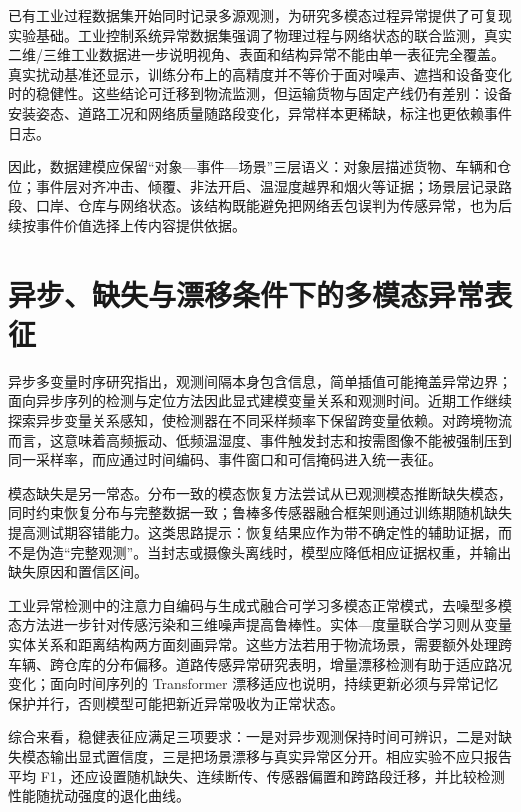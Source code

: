 \documentclass[11pt,a4paper]{article}
\begin{document}
已有工业过程数据集开始同时记录多源观测，为研究多模态过程异常提供了可复现实验基础\cite{amultimodaldataset2025}。工业控制系统异常数据集强调了物理过程与网络状态的联合监测\cite{industrialcontrolsystem2024}，真实二维/三维工业数据进一步说明视角、表面和结构异常不能由单一表征完全覆盖\cite{realiadd32025}。真实扰动基准还显示，训练分布上的高精度并不等价于面对噪声、遮挡和设备变化时的稳健性\cite{robustada2025}。这些结论可迁移到物流监测，但运输货物与固定产线仍有差别：设备安装姿态、道路工况和网络质量随路段变化，异常样本更稀缺，标注也更依赖事件日志。

因此，数据建模应保留“对象—事件—场景”三层语义：对象层描述货物、车辆和仓位；事件层对齐冲击、倾覆、非法开启、温湿度越界和烟火等证据；场景层记录路段、口岸、仓库与网络状态。该结构既能避免把网络丢包误判为传感异常，也为后续按事件价值选择上传内容提供依据。

\section{异步、缺失与漂移条件下的多模态异常表征}

异步多变量时序研究指出，观测间隔本身包含信息，简单插值可能掩盖异常边界；面向异步序列的检测与定位方法因此显式建模变量关系和观测时间\cite{practicalapproachto2021}。近期工作继续探索异步变量关系感知，使检测器在不同采样频率下保留跨变量依赖\cite{aaadasynchronousinter2025}。对跨境物流而言，这意味着高频振动、低频温湿度、事件触发封志和按需图像不能被强制压到同一采样率，而应通过时间编码、事件窗口和可信掩码进入统一表征。

模态缺失是另一常态。分布一致的模态恢复方法尝试从已观测模态推断缺失模态，同时约束恢复分布与完整数据一致\cite{distributionconsistentmodal2023}；鲁棒多传感器融合框架则通过训练期随机缺失提高测试期容错能力\cite{amultimodalsensor2022}。这类思路提示：恢复结果应作为带不确定性的辅助证据，而不是伪造“完整观测”。当封志或摄像头离线时，模型应降低相应证据权重，并输出缺失原因和置信区间。

工业异常检测中的注意力自编码与生成式融合可学习多模态正常模式\cite{mfganmultimodalfusion2024}，去噪型多模态方法进一步针对传感污染和三维噪声提高鲁棒性\cite{m3dmnrrgb2024}。实体—度量联合学习则从变量实体关系和距离结构两方面刻画异常\cite{madmelcombining2024}。这些方法若用于物流场景，需要额外处理跨车辆、跨仓库的分布偏移。道路传感异常研究表明，增量漂移检测有助于适应路况变化\cite{dynamicroadanomaly2024}；面向时间序列的 Transformer 漂移适应也说明，持续更新必须与异常记忆保护并行，否则模型可能把新近异常吸收为正常状态\cite{conceptdriftadaptation2022}。

综合来看，稳健表征应满足三项要求：一是对异步观测保持时间可辨识，二是对缺失模态输出显式置信度，三是把场景漂移与真实异常区分开。相应实验不应只报告平均 F1，还应设置随机缺失、连续断传、传感器偏置和跨路段迁移，并比较检测性能随扰动强度的退化曲线。
\end{document}
